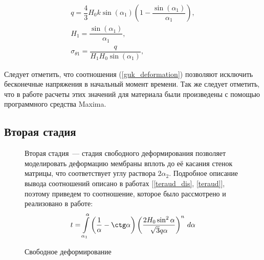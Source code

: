 	\begin{equation}
	\begin{split}
		q = \dfrac43 H_0k\sin(\alpha_1)\left(1-\dfrac{\sin(\alpha_1)}{\alpha_1} \right), \\
		H_1 = \dfrac{\sin(\alpha_1)}{\alpha_1},\\
		\sigma_{\theta1} = \dfrac{q}{H_1H_0\sin(\alpha_1)},
	\end{split}
	\label{guk_deformation}
	\end{equation}
	
	Следует отметить, что соотношения (\ref{guk_deformation}) позволяют исключить бесконечные напряжения в начальный момент времени.
	Так же следует отметить, что в работе расчеты этих значений для материала были произведены с помощью программного средства Maxima.
	 
	\subsection{Вторая стадия}

	\begin{figure}[h!]
		\begin{minipage}[h]{0.48\linewidth}

				
				\def\svgwidth{\columnwidth}

			\caption{ Свободное деформирование } 
		\end{minipage}
		\hfill
		\begin{minipage}[h]{0.48\linewidth}	
		Вторая стадия~--- стадия свободного деформирования позволяет моделировать 
    	деформацию мембраны вплоть до её касания стенок матрицы, что соответствует углу раствора $2\alpha_2$. Подробное описание вывода 
    	соотношений описано в работах  [\ref{teraud_dis}, \ref{teraud}], поэтому приведем то соотношение, которое было рассмотрено и реализовано 
    	в работе:
		\begin{equation}
        	t = \int\limits_{\alpha_1}^{\alpha}\left(\dfrac 1\alpha - \ctg\alpha \right)\left( \dfrac{2H_0\sin^2\alpha}{\sqrt 3 q\alpha} 
        	\right)^n\,d\alpha
	        \label{free_deformation_formula}
	    \end{equation}
	
		\end{minipage}
		\label{free_deformation_pic}
	\end{figure}
	
